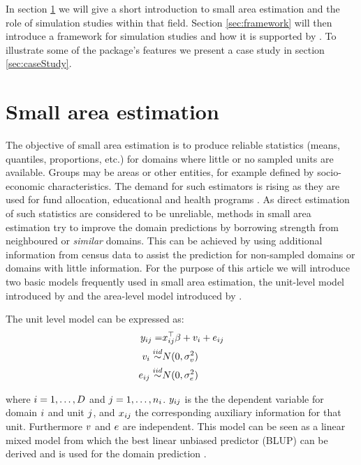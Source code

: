 \documentclass[article]{ajs}
\begin{document}
In section \ref{sec:SAE} we will give a short introduction to small area estimation and the role of simulation studies within that field. Section \ref{sec:framework} will then introduce a framework for simulation studies and how it is supported by . To illustrate some of the package's features we present a case study in section \ref{sec:caseStudy}.

\section{Small area estimation}
\label{sec:SAE}
The objective of small area estimation is to produce reliable statistics (means, quantiles, proportions, etc.) for domains where little or no sampled units are available. Groups may be areas or other entities, for example defined by socio-economic characteristics. The demand for such estimators is rising as they are used for fund allocation, educational and health programs \citep{pfeffermann13}. As direct estimation of such statistics are considered to be unreliable, methods in small area estimation try to improve the domain predictions by borrowing strength from neighboured or \textit{similar} domains. This can be achieved by using additional information from census data to assist the prediction for non-sampled domains or domains with little information. For the purpose of this article we will introduce two basic models frequently used in small area estimation, the unit-level model introduced by \cite{battese88} and the area-level model introduced by \cite{fay79}.

The unit level model \citep{battese88} can be expressed as:
\begin{eqnarray}
	 y_{ij} =& x_{ij}^\top\beta + v_{i} + e_{ij} \nonumber \\
	v_{i} \stackrel{iid}{\sim}& N(0, \sigma_v^2)  \nonumber \\
	e_{ij} \stackrel{iid}{\sim}& N(0, \sigma_e^2) \nonumber
\end{eqnarray}

where $i = 1, \dots, D$ and $j = 1, \dots, n_i$. $y_{ij}$ is the the dependent variable for domain $i$ and unit $j$, and $x_{ij}$ the corresponding auxiliary information for that unit. Furthermore $v$ and $e$ are independent. This model can be seen as a linear mixed model from which the best linear unbiased predictor (BLUP) can be derived and is used for the domain prediction \citep{rao03}.
\end{document}
